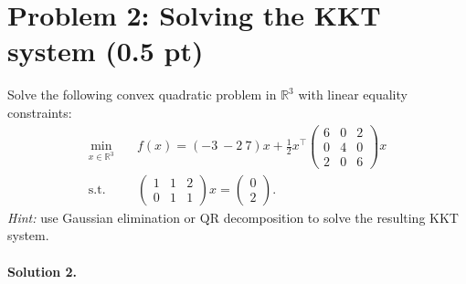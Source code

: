 \documentclass[11pt]{article}
\begin{document}
\section*{Problem 2: Solving the KKT system (0.5 pt)}

Solve the following convex quadratic problem in $\mathbb{R}^3$ with linear equality constraints:
\begin{equation*}
\begin{aligned}
\min_{x\in\mathbb{R}^3}\quad & f(x)
= (-3\ -2\ 7)x
+ \tfrac12 x^\top
\begin{pmatrix}
6 & 0 & 2\\
0 & 4 & 0\\
2 & 0 & 6
\end{pmatrix}
x \\[0.4em]
\text{s.t.}\quad &
\begin{pmatrix}
1 & 1 & 2\\
0 & 1 & 1
\end{pmatrix}x =
\begin{pmatrix}
0\\
2
\end{pmatrix}.
\end{aligned}
\end{equation*}
\noindent
\textit{Hint:} use Gaussian elimination or QR decomposition to solve the resulting KKT system.

\paragraph{Solution 2.}
\end{document}
